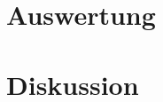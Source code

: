 \documentclass[twoside,        %
               BCOR12mm,       %
               english,ngerman, %
               fleqn,headsepline=false,footsepline=false
              ]{Vorlage/MFPREPORT}
\begin{document}
\section{Auswertung}
\label{sec:auswertung}



\section{Diskussion}

\clearpage

%
%
%
%



\end{document}
